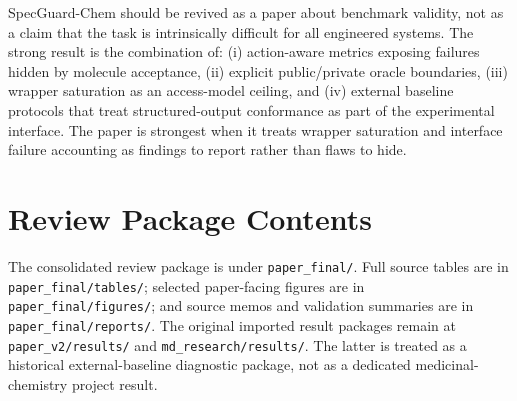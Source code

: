 \documentclass[11pt]{article}
\begin{document}
SpecGuard-Chem should be revived as a paper about benchmark validity, not as a
claim that the task is intrinsically difficult for all engineered systems. The
strong result is the combination of: (i) action-aware metrics exposing failures
hidden by molecule acceptance, (ii) explicit public/private oracle boundaries,
(iii) wrapper saturation as an access-model ceiling, and (iv) external baseline
protocols that treat structured-output conformance as part of the experimental
interface. The paper is strongest when it treats wrapper saturation and interface
failure accounting as findings to report rather than flaws to hide.

\section{Review Package Contents}

The consolidated review package is under \texttt{paper\_final/}. Full source
tables are in \texttt{paper\_final/tables/}; selected paper-facing figures are in
\texttt{paper\_final/figures/}; and source memos and validation summaries are in
\texttt{paper\_final/reports/}. The original imported result packages remain at
\texttt{paper\_v2/results/} and \texttt{md\_research/results/}. The latter is
treated as a historical external-baseline diagnostic package, not as a dedicated
medicinal-chemistry project result.
\end{document}
